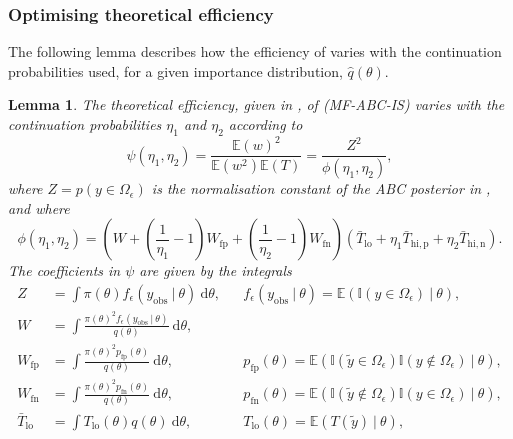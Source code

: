 \documentclass[12pt, onecolumn]{article}
\newcommand{\obs}[1]{#1_{\mathrm{obs}}}
\newcommand{\fp}[1]{#1_{\mathrm{fp}}}
\newcommand{\fn}[1]{#1_{\mathrm{fn}}}
\newtheorem{lemma}[theorem]{Lemma}
\begin{document}
\subsubsection{Optimising theoretical efficiency}
\label{s:eta:exact}

The following lemma describes how the efficiency of  varies with the continuation probabilities used, for a given importance distribution, $\hat q(\theta)$. 

\begin{lemma}
\label{lemma:phi}
The theoretical efficiency, given in , of  (MF-ABC-IS) varies with the continuation probabilities $\eta_1$ and $\eta_2$ according to
\[
\psi(\eta_1,\eta_2) = \frac{\mathbb E(w)^2}{\mathbb E(w^2) \mathbb E(T)} = \frac{Z^2}{\phi(\eta_1, \eta_2)},
\]
where $Z = p(y \in \Omega_\epsilon)$ is the normalisation constant of the ABC posterior in , and where
\begin{equation}
\label{eq:Phi}
\phi(\eta_1, \eta_2) = 
\left(  W + \left( \frac{1}{\eta_1} - 1 \right) \fp W + \left( \frac{1}{\eta_2} - 1 \right) \fn W \right)
\left( \bar{T}_{\mathrm{lo}}
 + \eta_1 \bar T_{\mathrm{hi}, \mathrm p}
 + \eta_2 \bar T_{\mathrm{hi}, \mathrm n} \right).
\end{equation}
The coefficients in $\psi$ are given by the integrals
\begin{subequations}
\label{eq:PhiComponents}
\begin{align}
\label{eq:Z}
Z &= \int \pi(\theta) f_\epsilon(\obs y~|~\theta) ~\mathrm d\theta
,&
&f_\epsilon(\obs y~|~\theta) = \mathbb E \left(\mathbb I(y \in \Omega_\epsilon) ~|~\theta \right) 
,\\
W &= \int \frac{\pi(\theta)^2 f_\epsilon(\obs y~|~\theta)}{q(\theta)} ~\mathrm d\theta
,\\
\fp W &= \int \frac{\pi(\theta)^2 \fp p(\theta)}{q(\theta)} ~\mathrm d\theta 
,&
&\fp p(\theta) = \mathbb E \left(\mathbb I ( \tilde y \in \Omega_\epsilon) \mathbb I(y \notin \Omega_\epsilon) ~|~\theta \right) 
,\\
\fn W &= \int \frac{\pi(\theta)^2 \fn p(\theta)}{q(\theta)} ~\mathrm d\theta 
,&
&\fn p(\theta) = \mathbb E \left(\mathbb I ( \tilde y \notin \Omega_\epsilon) \mathbb I(y \in \Omega_\epsilon) ~|~\theta \right) 
,\\
\bar T_{\mathrm{lo}} &= \int T_{\mathrm{lo}}(\theta) q(\theta) ~\mathrm d\theta
,&
&T_{\mathrm{lo}}(\theta) = \mathbb E(T(\tilde y) ~|~\theta)
,\\

\end{align}
\end{subequations}
\end{lemma}
\end{document}
